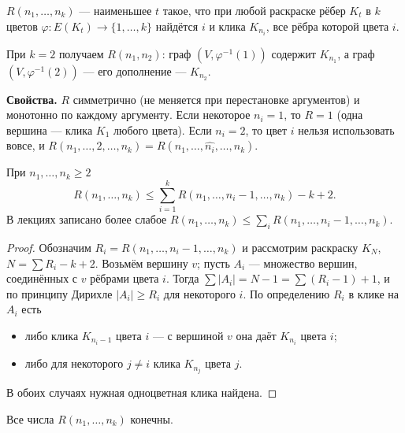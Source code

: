 \begin{definition}
\(R(n_1,\ldots,n_k)\) — наименьшее \(t\) такое, что при любой раскраске рёбер \(K_t\)
в \(k\) цветов \(\varphi\colon E(K_t)\to\{1,\ldots,k\}\) найдётся \(i\) и клика \(K_{n_i}\),
все рёбра которой цвета \(i\).
\end{definition}
При \(k=2\) получаем \(R(n_1,n_2)\): граф \((V,\varphi^{-1}(1))\) содержит \(K_{n_1}\),
а граф \((V,\varphi^{-1}(2))\) — его дополнение — \(K_{n_2}\).
\begin{tcolorbox}[colback=cbGrayBack,colframe=cbGray!55]
\textbf{Свойства.} \(R\) симметрично (не меняется при перестановке аргументов) и
монотонно по каждому аргументу. Если некоторое \(n_i=1\), то \(R=1\) (одна вершина —
клика \(K_1\) любого цвета). Если \(n_i=2\), то цвет \(i\) нельзя использовать вовсе, и
\(R(n_1,\ldots,2,\ldots,n_k)=R(n_1,\ldots,\widehat{n_i},\ldots,n_k)\).
\end{tcolorbox}

\begin{theorem}
При \(n_1,\ldots,n_k\ge2\)
\[
R(n_1,\ldots,n_k)\le\sum_{i=1}^{k}R(n_1,\ldots,n_i-1,\ldots,n_k)-k+2 .
\]
В лекциях записано более слабое \(R(n_1,\ldots,n_k)\le\sum_iR(n_1,\ldots,n_i-1,\ldots,n_k)\).
\end{theorem}
\begin{proof}
Обозначим \(R_i=R(n_1,\ldots,n_i-1,\ldots,n_k)\) и рассмотрим раскраску \(K_N\),
\(N=\sum R_i-k+2\). Возьмём вершину \(v\); пусть \(A_i\) — множество вершин, соединённых
с \(v\) рёбрами цвета \(i\). Тогда \(\sum|A_i|=N-1=\sum(R_i-1)+1\), и по принципу
Дирихле \(|A_i|\ge R_i\) для некоторого \(i\). По определению \(R_i\) в клике на \(A_i\) есть
\begin{itemize}\tightlist
\item либо клика \(K_{n_i-1}\) цвета \(i\) — с вершиной \(v\) она даёт \(K_{n_i}\) цвета \(i\);
\item либо для некоторого \(j\ne i\) клика \(K_{n_j}\) цвета \(j\).
\end{itemize}
В обоих случаях нужная одноцветная клика найдена.
\end{proof}

\begin{cor}
Все числа \(R(n_1,\ldots,n_k)\) конечны.
\end{cor}

